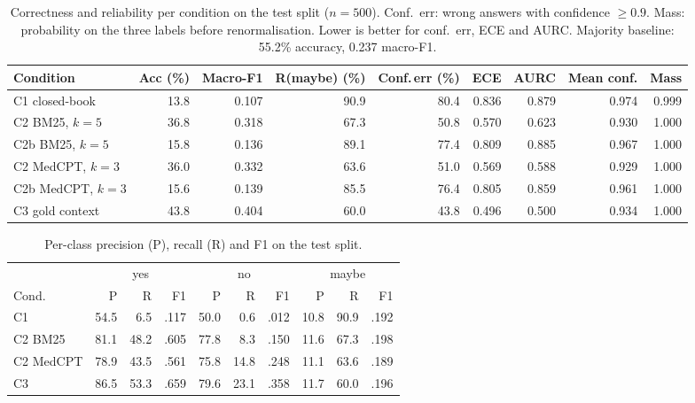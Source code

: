 \documentclass[conference]{IEEEtran}
\begin{document}
\begin{table}[t]
\centering
\caption{Correctness and reliability per condition on the test split ($n=500$).
Conf.\ err: wrong answers with confidence $\geq 0.9$. Mass: probability on the
three labels before renormalisation. Lower is better for conf.\ err, ECE and
AURC. Majority baseline: 55.2\% accuracy, 0.237 macro-F1.}
\label{tab:main}
\begin{tabular}{lrrrrrrrr}
\toprule
Condition & Acc (\%) & Macro-F1 & R(maybe) (\%) & Conf.\,err (\%) & ECE & AURC & Mean conf. & Mass \\
\midrule
C1 closed-book & 13.8 & 0.107 & 90.9 & 80.4 & 0.836 & 0.879 & 0.974 & 0.999 \\
C2 BM25, $k=5$ & 36.8 & 0.318 & 67.3 & 50.8 & 0.570 & 0.623 & 0.930 & 1.000 \\
C2b BM25, $k=5$ & 15.8 & 0.136 & 89.1 & 77.4 & 0.809 & 0.885 & 0.967 & 1.000 \\
C2 MedCPT, $k=3$ & 36.0 & 0.332 & 63.6 & 51.0 & 0.569 & 0.588 & 0.929 & 1.000 \\
C2b MedCPT, $k=3$ & 15.6 & 0.139 & 85.5 & 76.4 & 0.805 & 0.859 & 0.961 & 1.000 \\
C3 gold context & 43.8 & 0.404 & 60.0 & 43.8 & 0.496 & 0.500 & 0.934 & 1.000 \\
\bottomrule
\end{tabular}
\end{table}

\begin{table}[t]
\centering
\caption{Per-class precision (P), recall (R) and F1 on the test split.}
\label{tab:perclass}
\setlength{\tabcolsep}{2.5pt}
\begin{tabular}{@{}lrrrrrrrrr@{}}
\toprule
 & \multicolumn{3}{c}{yes} & \multicolumn{3}{c}{no} & \multicolumn{3}{c}{maybe} \\
Cond. & P & R & F1 & P & R & F1 & P & R & F1 \\
\midrule
C1 & 54.5 & 6.5 & .117 & 50.0 & 0.6 & .012 & 10.8 & 90.9 & .192 \\
C2 BM25 & 81.1 & 48.2 & .605 & 77.8 & 8.3 & .150 & 11.6 & 67.3 & .198 \\
C2 MedCPT & 78.9 & 43.5 & .561 & 75.8 & 14.8 & .248 & 11.1 & 63.6 & .189 \\
C3 & 86.5 & 53.3 & .659 & 79.6 & 23.1 & .358 & 11.7 & 60.0 & .196 \\
\bottomrule
\end{tabular}
\end{table}
\end{document}
